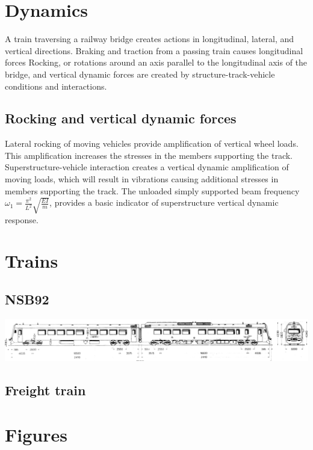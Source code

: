\section{Dynamics}
A train traversing a railway bridge creates actions in longitudinal, lateral, and vertical directions. Braking and traction from a passing train causes longitudinal forces
Rocking, or rotations around an axis parallel to the longitudinal axis of the bridge, and vertical dynamic forces are created by structure-track-vehicle conditions and interactions.
\subsection{Rocking and vertical dynamic forces}
Lateral rocking of moving vehicles provide amplification of vertical  wheel loads. This amplification increases the stresses in the members supporting the track.
%
Superstructure-vehicle interaction creates a vertical dynamic amplification of moving loads, which will result in vibrations causing additional stresses in members supporting the track.
%
The unloaded simply supported beam frequency $\omega_1 = \frac{\pi^2}{L^2}\sqrt{\frac{EI}{m}}$, provides a basic indicator of superstructure vertical dynamic response.
%
\section{Trains}
\subsection{NSB92}
\label{appendix:nsb92}
\includegraphics[width=0.8\pageheight, height=0.5\pagewidth, angle=270]{./figures/nsb92.png}
\subsection{Freight train}
%
%
\newpage
\section{Figures}
%
